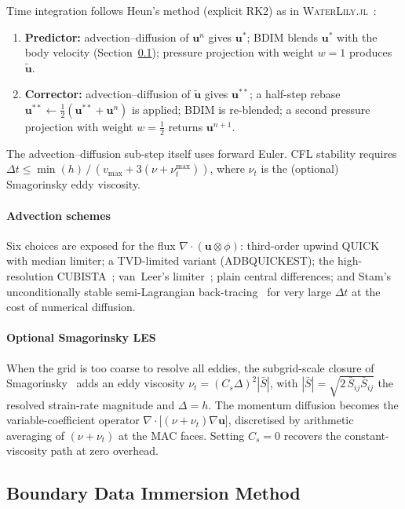 \documentclass[journal,twoside,10pt]{IEEEtran}
\newcommand{\waterlily}{\textsc{WaterLily.jl}\xspace}
\begin{document}
Time integration follows Heun's method (explicit RK2) as in
\waterlily~\cite{weymouth2024waterlily}:
\begin{enumerate}
\item \textbf{Predictor:} advection--diffusion of $\mathbf u^{n}$
  gives $\mathbf u^{*}$; BDIM blends $\mathbf u^{*}$ with the
  body velocity (Section~\ref{sec:bdim}); pressure projection with
  weight $w{=}1$ produces $\tilde{\mathbf u}$.
\item \textbf{Corrector:} advection--diffusion of $\tilde{\mathbf u}$
  gives $\mathbf u^{**}$; a half-step rebase
  $\mathbf u^{**}\!\leftarrow\!\tfrac12(\mathbf u^{**}+\mathbf u^{n})$
  is applied; BDIM is re-blended; a second pressure projection with
  weight $w{=}\tfrac12$ returns $\mathbf u^{n+1}$.
\end{enumerate}
The advection--diffusion sub-step itself uses forward Euler.  CFL
stability requires
$\Delta t \le \min(h)\,/\,(v_{\max} + 3(\nu+\nu_t^{\max}))$,
where $\nu_t$ is the (optional) Smagorinsky eddy viscosity.

\paragraph{Advection schemes}  Six choices are exposed for the flux
$\nabla\!\cdot\!(\mathbf u\!\otimes\!\phi)$:
third-order upwind QUICK~\cite{leonard1979quick} with median limiter;
a TVD-limited variant (ADBQUICKEST); the high-resolution
CUBISTA~\cite{alves2003convergent}; van~Leer's
limiter~\cite{vanleer1979towards}; plain central differences; and
Stam's unconditionally stable semi-Lagrangian
back-tracing~\cite{stam1999stable} for very large $\Delta t$ at the
cost of numerical diffusion.

\paragraph{Optional Smagorinsky LES}  When the grid is too coarse to
resolve all eddies, the subgrid-scale closure of
Smagorinsky~\cite{smagorinsky1963general} adds an eddy viscosity
$\nu_t=(C_s\Delta)^{2}|\bar S|$, with
$|\bar S|=\sqrt{2\,\bar S_{ij}\bar S_{ij}}$ the resolved strain-rate
magnitude and $\Delta=h$.  The momentum diffusion becomes the
variable-coefficient operator
$\nabla\!\cdot\!\bigl[(\nu+\nu_t)\nabla\mathbf u\bigr]$,
discretised by arithmetic averaging of $(\nu+\nu_t)$ at the MAC
faces.  Setting $C_s{=}0$ recovers the constant-viscosity path at
zero overhead.


\subsection{Boundary Data Immersion Method}\label{sec:bdim}
\end{document}

